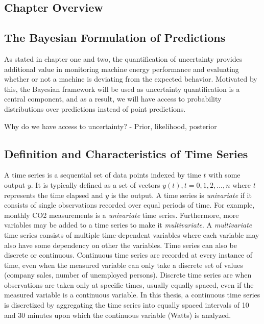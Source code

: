 \subsection{Chapter Overview}

\subsection{The Bayesian Formulation of Predictions}

As stated in chapter one and two, the quantification of uncertainty provides additional value in monitoring machine energy performance and evaluating whether or not a machine is deviating from the expected behavior. Motivated by this, the Bayesian framework will be used as uncertainty quantification is a central component, and as a result, we will have access to probability distributions over predictions instead of point predictions.

Why do we have access to uncertainty?
 - Prior, likelihood, posterior
 

\subsection{Definition and Characteristics of Time Series}

A time series is a sequential set of data points indexed by time $t$ with some output $y$. It is typically defined as a set of vectors $y(t), t = 0, 1, 2,. . .,n$ where $t$ represents the time elapsed and $y$ is the output. A time series is \textit{univariate} if it consists of single observations recorded over equal periods of time. For example, monthly CO2 measurements is a \textit{univariate} time series. Furthermore, more variables may be added to a time series to make it \textit{multivariate}. A \textit{multivariate} time series consists of multiple time-dependent variables where each variable may also have some dependency on other the variables. Time series can also be discrete or continuous. Continuous time series are recorded at every instance of time, even when the measured variable can only take a discrete set of values (company sales, number of unemployed persons). Discrete time series are when observations are taken only at specific times, usually equally spaced, even if the measured variable is a continuous variable. In this thesis, a continuous time series is discretized by aggregating the time series into equally spaced intervals of 10 and 30 minutes upon which the continuous variable (Watts) is analyzed. 

